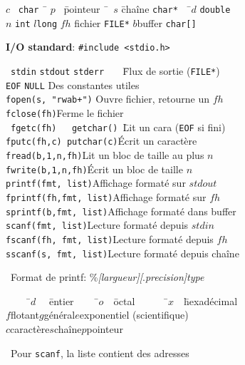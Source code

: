 \documentclass[a4paper,10pt,landscape]{article}
\begin{document}
\begin{minipage}{1.0\linewidth}
\begin{multicols}{3}
  \vspace{-\baselineskip}  
  \begin{tabbing}
    $c$~ \=\verb=char = \= $p$~ \=pointeur~ \=~$s$ \=chaîne \verb=char*=~~ \=$d$ \=\verb=double=\\
    $n$ \> \verb=int= \>$l$\>\verb=long= \>$\!\!$$fh$ \>fichier \verb=FILE*= \>$b$\>buffer \verb=char[]=
  \end{tabbing}
  \vspace{-\baselineskip}

  \textbf{I/O standard}: \verb=#include <stdio.h>=\vspace{-.7\baselineskip}
  \begin{tabbing}
    ~\=\verb=stdin= \=\verb=stdout= \=\verb=stderr   =   \=Flux de sortie (\verb=FILE*=)\\
    \>\verb=EOF= \>\verb=NULL= \>\>Des constantes utiles\\
    \>\verb=fopen(s, "rwab+")= \>\>\>Ouvre fichier, retourne un $fh$\\
    \>\verb=fclose(fh)=\>\>\>Ferme le fichier\\
    \pushtabs
    ~\=\verb=fgetc(fh)   getchar() =\=Lit un cara (\verb=EOF= si fini)\\
    \>\verb=fputc(fh,c) putchar(c)=\>Écrit un caractère\\
    \>\verb=fread(b,1,n,fh)=\>Lit un bloc de taille au plus $n$\\
    \>\verb=fwrite(b,1,n,fh)=\>Écrit un bloc de taille $n$\\
    \>\verb=printf(fmt, list)=\>Affichage formaté sur $stdout$\\
    \>\verb=fprintf(fh,fmt, list)=\>Affichage formaté sur $fh$\\
    \>\verb=sprintf(b,fmt, list)=\>Affichage formaté dans buffer\\
    \>\verb=scanf(fmt, list)=\>Lecture formaté depuis $stdin$\\
    \>\verb=fscanf(fh, fmt, list)=\>Lecture formaté depuis $fh$\\
    \>\verb=sscanf(s, fmt, list)=\>Lecture formaté depuis chaîne
    \poptabs
  \end{tabbing}
  \vspace{-.8\baselineskip}
  ~Format de printf: \%\textit{[largueur][}.\textit{precision]}\textit{type}
  \vspace{-.8\baselineskip}
  \begin{tabbing}
    ~~~~~\=$d$~~ \=entier~~~~~\=$o$~~\=octal~~~~~~ \=$x$~~\=hexadécimal\\
    \>$f$\>flotant\>$g$\>général\>$e$\>exponentiel (scientifique)\\
    \>$c$\>caractère\>$s$\>chaîne\>$p$\>pointeur
  \end{tabbing}
  \vspace{-.8\baselineskip}
  ~Pour \verb=scanf=, la liste contient des adresses


\end{multicols}
\end{minipage}
\end{document}
